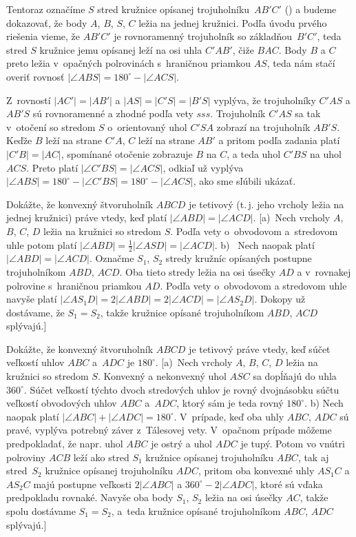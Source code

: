 {   \Jres
Tentoraz označíme $S$ stred kružnice opísanej trojuholníku~$AB'C'$ (\obr)
a budeme dokazovať, že body $A$, $B$, $S$, $C$ ležia na
jednej kružnici. Podľa úvodu prvého riešenia vieme, že $AB'C'$
je rovnoramenný trojuholník so základňou~$B'C'$, teda stred $S$
kružnice jemu opísanej leží na osi uhla $C'AB'$, čiže $BAC$.
Body $B$ a $C$ preto ležia v~opačných polrovinách s~hraničnou
priamkou $AS$, teda nám
stačí overiť rovnosť $|\angle ABS| = 180^\circ - |\angle ACS|$.
%

Z~rovností $|AC'| = |AB'|$ a $|AS| = |C'S| = |B'S|$ vyplýva, že
trojuholníky $C'AS$ a $AB'S$ sú rovnoramenné a zhodné podľa vety $sss$.
Trojuholník $C'AS$ sa tak v~otočení so stredom $S$ o~orientovaný
uhol $C'SA$ zobrazí na trojuholník $AB'S$. Keďže $B$ leží na strane $C'A$,
$C$ leží na strane $AB'$ a pritom podľa zadania platí $|C'B| = |AC|$,
spomínané otočenie zobrazuje $B$ na $C$, a teda uhol $C'BS$ na uhol $ACS$.
Preto platí $|\angle C'BS| = |\angle ACS|$, odkiaľ už vyplýva
$|\angle ABS| = 180^\circ - |\angle C'BS| = 180^\circ - |\angle
ACS|$, ako sme sľúbili ukázať.

Dokážte, že konvexný štvoruholník $ABCD$ je tetivový (t.\,j. jeho
vrcholy ležia na jednej kružnici) práve vtedy, keď platí $|\angle
ABD| = |\angle ACD|$.
[a)~Nech vrcholy $A$, $B$, $C$, $D$ ležia na kružnici so
stredom $S$. Podľa vety o~obvodovom a~stredovom uhle potom platí
$|\angle ABD| = \frac12|\angle ASD| = |\angle ACD|$. b) ~Nech
naopak platí $|\angle ABD| = |\angle ACD|$. Označme $S_1$, $S_2$
stredy kružníc opísaných postupne trojuholníkom $ABD$, $ACD$.
Oba tieto stredy ležia na osi úsečky $AD$ a v~rovnakej polrovine
s~hraničnou priamkou $AD$. Podľa vety o~obvodovom a stredovom uhle
navyše platí $|\angle AS_1D| = 2|\angle ABD| = 2|\angle
ACD| = |\angle AS_2D|$. Dokopy už dostávame, že $S_1=S_2$, takže
kružnice opísané trojuholníkom $ABD$, $ACD$ splývajú.]

Dokážte, že konvexný štvoruholník $ABCD$ je tetivový
práve vtedy, keď súčet veľkostí uhlov $ABC$ a~$ADC$ je $180^\circ$.
[a)~Nech vrcholy $A$, $B$, $C$, $D$ ležia na kružnici so stredom $S$.
Konvexný a nekonvexný uhol $ASC$ sa dopĺňajú do uhla $360^\circ$.
Súčet veľkostí týchto dvoch stredových uhlov je rovný
dvojnásobku súčtu veľkostí obvodových uhlov $ABC$ a~$ADC$,
ktorý sám je teda rovný $180^\circ$. b) Nech naopak
platí $|\angle ABC| + |\angle ADC| = 180^\circ$. V~prípade, keď
oba uhly $ABC$, $ADC$ sú pravé, vyplýva potrebný záver
z~Tálesovej vety. V~opačnom prípade môžeme predpokladať, že napr.
uhol $ABC$ je ostrý a uhol $ADC$ je tupý. Potom vo vnútri polroviny
$ACB$ leží ako stred $S_1$ kružnice opísanej trojuholníku $ABC$,
tak aj stred~$S_2$ kružnice opísanej trojuholníku $ADC$, pritom oba konvexné uhly
$AS_1C$ a $AS_2C$ majú postupne veľkosti $2|\angle ABC|$ a
$360^\circ-2|\angle ADC|$, ktoré sú vďaka predpokladu rovnaké.
Navyše oba body $S_1$, $S_2$ ležia na osi úsečky $AC$, takže spolu
dostávame $S_1 = S_2$, a~teda kružnice opísané trojuholníkom $ABC$, $ADC$
splývajú.]

}
